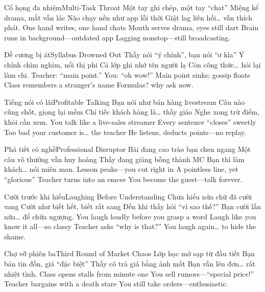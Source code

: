 \begin{tutuyetbox}{Cổ họng đa nhiệm}{Multi-Task Throat}
Một tay ghi chép, một tay “chat”
Miệng kể drama, mắt vẫn lác
Não chạy nền như app lỗi thời
Giật lag liên hồi… vẫn thích phát.
\tcblower
One hand writes, one hand chats
Mouth serves drama, eyes still dart
Brain runs in background—outdated app
Lagging nonstop—still broadcasting.
\end{tutuyetbox}

\begin{tutuyetbox}{Đề cương bị át}{Syllabus Drowned Out}
Thầy nói “ý chính”, bạn nói “ơ kìa”
Ý chính chìm nghỉm, nổi thị phi
Cả lớp ghi nhớ tên người lạ
Còn công thức… hỏi lại làm chi.
\tcblower
Teacher: “main point.” You: “oh wow!”
Main point sinks; gossip floats
Class remembers a stranger’s name
Formulas? why ask now.
\end{tutuyetbox}

\begin{tutuyetbox}{Tiếng nói có lãi}{Profitable Talking}
Bạn nói như bán hàng livestream
Câu nào cũng chốt, giọng lại mềm
Chỉ tiếc khách hàng là… thầy giáo
Nghe xong trừ điểm, khỏi cần xem.
\tcblower
You talk like a live-sales streamer
Every sentence “closes” sweetly
Too bad your customer is… the teacher
He listens, deducts points—no replay.
\end{tutuyetbox}

\begin{tutuyetbox}{Phá tiết có nghề}{Professional Disruptor}
Bài đang cao trào bạn chen ngang
Một câu vô thưởng vẫn huy hoàng
Thầy đang giảng bỗng thành MC
Bạn thì làm khách… nói miên man.
\tcblower
Lesson peaks—you cut right in
A pointless line, yet “glorious”
Teacher turns into an emcee
You become the guest—talk forever.
\end{tutuyetbox}

\begin{tutuyetbox}{Cười trước khi hiểu}{Laughing Before Understanding}
Chưa hiểu nửa chữ đã cười vang
Cười như biết hết, biết rất sang
Đến khi thầy hỏi “vì sao thế?”
Bạn cười lần nữa… để chữa ngượng.
\tcblower
You laugh loudly before you grasp a word
Laugh like you know it all—so classy
Teacher asks “why is that?”
You laugh again… to hide the shame.
\end{tutuyetbox}

\begin{tutuyetbox}{Chợ vỡ phiên ba}{Third Round of Market Chaos}
Lớp học mở sạp từ đầu tiết
Bạn bán tin đồn, giá “đặc biệt”
Thầy cô trả giá bằng ánh mắt
Bạn vẫn lên đơn… rất nhiệt tình.
\tcblower
Class opens stalls from minute one
You sell rumors—“special price!”
Teacher bargains with a death stare
You still take orders—enthusiastic.
\end{tutuyetbox}

